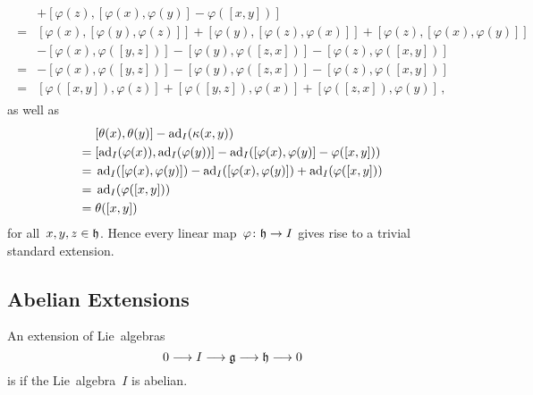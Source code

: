 \begin{fluff}
\begin{gather*}
\begin{aligned}
      {}&
      + [ \varphi(z), [\varphi(x), \varphi(y)] - \varphi([x,y]) ]
      \\
      ={}&
      [ \varphi(x), [\varphi(y), \varphi(z)] ]
      + [ \varphi(y), [\varphi(z), \varphi(x)] ]
      + [ \varphi(z), [\varphi(x), \varphi(y)] ]
      \\
      {}&
      - [ \varphi(x), \varphi([y,z]) ]
      - [ \varphi(y), \varphi([z,x]) ]
      - [ \varphi(z), \varphi([x,y]) ]
      \\
      ={}&
      - [ \varphi(x), \varphi([y,z]) ]
      - [ \varphi(y), \varphi([z,x]) ]
      - [ \varphi(z), \varphi([x,y]) ]
      \\
      ={}&
      [ \varphi([x,y]), \varphi(z) ]
      + [ \varphi([y,z]), \varphi(x) ]
      + [ \varphi([z,x]), \varphi(y) ] \,,
    \end{aligned}
  \end{gather*}
  as well as
  \begin{align*}
    {}&
    [\theta(x), \theta(y)] - \operatorname{ad}_I( \kappa(x,y) )
    \\
    ={}&
    [ \operatorname{ad}_I(\varphi(x)), \operatorname{ad}_I(\varphi(y)) ] - \operatorname{ad}_I( [\varphi(x), \varphi(y)] - \varphi([x,y]) )
    \\
    ={}&
    \operatorname{ad}_I( [\varphi(x), \varphi(y)] ) - \operatorname{ad}_I( [\varphi(x), \varphi(y)] ) + \operatorname{ad}_I( \varphi([x,y]) )
    \\
    ={}&
    \operatorname{ad}_I( \varphi([x,y]) )
    \\
    ={}&
    \theta([x,y])
  \end{align*}
  for all~$x, y, z \in \mathfrak{h}$.
  Hence every linear map~$\varphi \colon \hlie \to I$ gives rise to a trivial standard extension.
\end{fluff}



\subsection{Abelian Extensions}

\begin{definition}
  An extension of Lie~algebras
  \[
    0 \to I \to \glie \to \hlie \to 0
  \]
  is  if the Lie~algebra~$I$ is abelian.
\end{definition}


